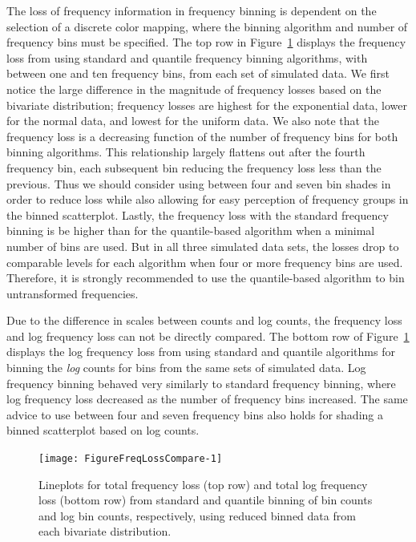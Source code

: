 \documentclass[11pt]{isuthesis}\usepackage[]{graphicx}\usepackage[]{color}
\newenvironment{knitrout}{}{} %
\begin{document}
The loss of frequency information in frequency binning is dependent on the selection of a discrete color mapping, where the binning algorithm and number of frequency bins must be specified. The top row in Figure~\ref{fig:FreqLossCompare} displays the frequency loss from using standard and quantile frequency binning algorithms, with between one and ten frequency bins, from each set of simulated data. We first notice the large difference in the magnitude of frequency losses based on the bivariate distribution; frequency losses are highest for the exponential data, lower for the normal data, and lowest for the uniform data. We also note that the frequency loss is a decreasing function of the number of frequency bins for both binning algorithms. This relationship largely flattens out after the fourth frequency bin, each subsequent bin reducing the frequency loss less than the previous. Thus we should consider using between four and seven bin shades in order to reduce loss while also allowing for easy perception of frequency groups in the binned scatterplot. Lastly, the frequency loss with the standard frequency binning is be higher than for the quantile-based algorithm when a minimal number of bins are used. But in all three simulated data sets, the losses drop to comparable levels for each algorithm when four or more frequency bins are used. Therefore, it is strongly recommended to use the quantile-based algorithm to bin untransformed frequencies.

Due to the difference in scales between counts and log counts, the frequency loss and log frequency loss can not be directly compared. The bottom row of Figure~\ref{fig:FreqLossCompare} displays the log frequency loss from using standard and quantile algorithms for binning the \textit{log} counts for bins from the same sets of simulated data. Log frequency binning behaved very similarly to standard frequency binning, where log frequency loss decreased as the number of frequency bins increased. The same advice to use between four and seven frequency bins also holds for shading a binned scatterplot based on log counts. 

\begin{knitrout}
\color{fgcolor}\begin{figure}[H]

{\centering \texttt{[image: FigureFreqLossCompare-1]} 

}

\caption[Lineplots for total frequency loss (top row) and total log frequency loss (bottom row) from standard and quantile binning of bin counts and log bin counts, respectively, using reduced binned data from each bivariate distribution]{Lineplots for total frequency loss (top row) and total log frequency loss (bottom row) from standard and quantile binning of bin counts and log bin counts, respectively, using reduced binned data from each bivariate distribution. }\label{fig:FreqLossCompare}
\end{figure}


\end{knitrout}
\end{document}

